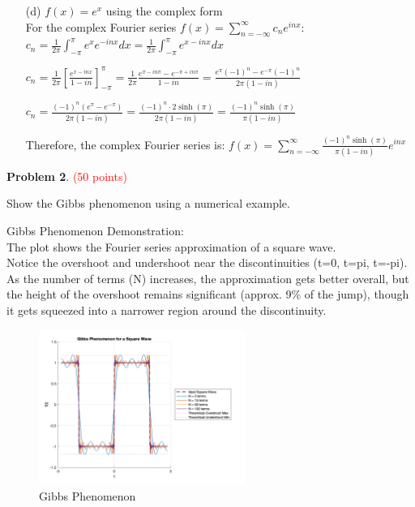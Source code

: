 \documentclass[english,onecolumn]{IEEEtran}
\begin{document}
\begin{itemize}
	\item[(d)] $f(x) = e^x$ using the complex form\\
	For the complex Fourier series $f(x) = \sum_{n=-\infty}^{\infty}c_n e^{inx}$:\\

	$c_n = \frac{1}{2\pi}\int_{-\pi}^{\pi}e^x e^{-inx}dx = \frac{1}{2\pi}\int_{-\pi}^{\pi}e^{x-inx}dx$

	$c_n = \frac{1}{2\pi}\left[\frac{e^{x-inx}}{1-in}\right]_{-\pi}^{\pi} = \frac{1}{2\pi}\frac{e^{\pi-in\pi}-e^{-\pi+in\pi}}{1-in} = \frac{e^{\pi}(-1)^n-e^{-\pi}(-1)^n}{2\pi(1-in)}$

	$c_n = \frac{(-1)^n(e^{\pi}-e^{-\pi})}{2\pi(1-in)} = \frac{(-1)^n \cdot 2\sinh(\pi)}{2\pi(1-in)} = \frac{(-1)^n\sinh(\pi)}{\pi(1-in)}$

	Therefore, the complex Fourier series is: $f(x) = \sum_{n=-\infty}^{\infty}\frac{(-1)^n\sinh(\pi)}{\pi(1-in)}e^{inx}$

\end{itemize}

\noindent\textbf{Problem 2}. \textcolor{red}{(50 points)} \par
Show the Gibbs phenomenon using a numerical example. 


Gibbs Phenomenon Demonstration:\\
The plot shows the Fourier series approximation of a square wave.\\
Notice the overshoot and undershoot near the discontinuities (t=0, t=pi, t=-pi).\\
As the number of terms (N) increases, the approximation gets better overall,
but the height of the overshoot remains significant (approx. 9\% of the jump),
though it gets squeezed into a narrower region around the discontinuity.

\begin{figure}[h]
	\centering
	\includegraphics[width=0.6\textwidth]{Gibbs.png}
	\caption{Gibbs Phenomenon}
	\label{fig:gibbs}
\end{figure}
\end{document}
